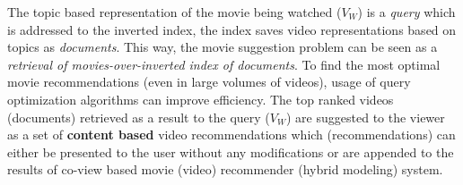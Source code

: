 The topic based representation of the movie being watched ($V_W$) is a \textit{query} which is addressed to the inverted index, the index saves video representations based on topics as \textit{documents}. This way, the movie suggestion problem can be seen as a \textit{retrieval of movies-over-inverted index of documents}. To find the most optimal movie recommendations (even in large volumes of videos), usage of query optimization algorithms can improve efficiency. The top ranked videos (documents) retrieved as a result to the query ($V_W$) are suggested to the viewer as a set of \textbf{content based} video recommendations which (recommendations) can either be presented to the user without any modifications or are appended to the results of co-view based movie (video) recommender (hybrid modeling) system.
